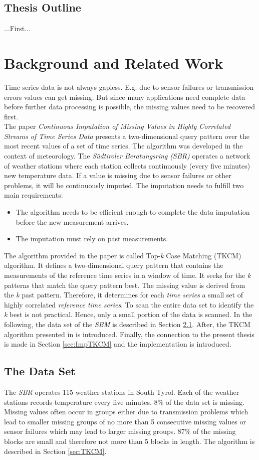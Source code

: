 \documentclass[abstracton,12pt]{scrreprt}
\begin{document}
\section{Thesis Outline}
...First...

\chapter{Background and Related Work}
Time series data is not always gapless. E.g. due to sensor failures or transmission errors values can get missing. But since many applications need complete data before further data processing is possible, the missing values need to be recovered first. \\The paper \emph{Continuous Imputation of Missing Values in Highly Correlated Streams of Time Series Data} \cite{BScT} presents a two-dimensional query pattern over the most recent values of a set of time series. The algorithm was developed in the context of meteorology. The \emph{Südtiroler Beratungsring (SBR)} operates a network of weather stations where each station collects continuously (every five minutes) new temperature data. If a value is missing due to sensor failures or other problems, it will be continuously imputed. The imputation needs to fulfill two main requirements: 
\begin{itemize}  
	\item The algorithm needs to be efficient enough to complete the data imputation before the new measurement arrives. 
	\item The imputation must rely on past measurements.
\end{itemize}
The algorithm provided in the paper is called Top-\emph{k} Case Matching (TKCM) algorithm. It defines a two-dimensional query pattern that contains the measurements of the reference time series in a window of time. It seeks for the \emph{k} patterns that match the query pattern best. The missing value is derived from the \emph{k} past pattern. Therefore, it determines for each \emph{time series} a small set of highly correlated \emph{reference time series}. To scan the entire data set to identify the \emph{k} best is not practical. Hence, only a small portion of the data is scanned. In the following, the data set of the \emph{SBM} is described in Section \ref{sec:DS}. After, the TKCM algorithm presented in \cite{BScT} is introduced. Finally, the connection to the present thesis is made in Section \ref{sec:ImpTKCM} and the implementation is introduced. 


\section{The Data Set}
\label{sec:DS}
The \emph{SBR} operates 115 weather stations in South Tyrol. Each of the weather stations records temperature every five minutes. 8\% of the data set is missing. Missing values often occur in groups either due to transmission problems which lead to smaller missing groups of no more than 5 consecutive missing values or sensor failures which may lead to larger missing groups. 87\% of the missing blocks are small and therefore not more than 5 blocks in length. The algorithm is described in Section \ref{sec:TKCM}. 
\end{document}
